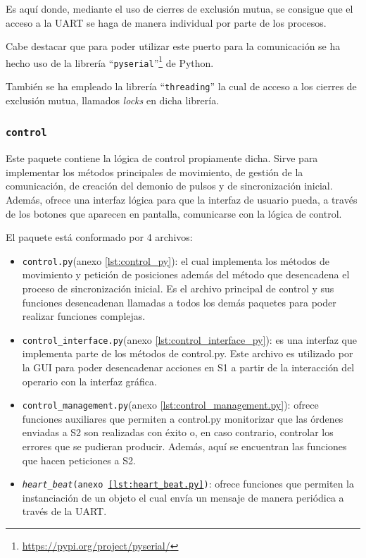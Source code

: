Es aquí donde, mediante el uso de cierres de exclusión mutua, se consigue que el acceso a la UART se haga de manera individual por parte de los procesos.

Cabe destacar que para poder utilizar este puerto para la comunicación se ha hecho uso de la librería ``\texttt{pyserial}''\footnote{\url{https://pypi.org/project/pyserial/}} de Python.

También se ha empleado la librería ``\texttt{threading}'' la cual de acceso a los cierres de exclusión mutua, llamados \textit{locks} en dicha librería.

\subsubsection{\texttt{control}}

Este paquete contiene la lógica de control propiamente dicha. Sirve para implementar los métodos principales de movimiento, de gestión de la comunicación, de creación del demonio de pulsos y de  sincronización inicial. Además, ofrece una interfaz lógica para que la interfaz de usuario pueda, a través de los botones que aparecen en pantalla, comunicarse con la lógica de control.

El paquete está conformado por 4 archivos:

\begin{itemize}
    \item \texttt{control.py}(anexo \ref{lst:control_py}): el cual implementa los métodos de movimiento y petición de posiciones además del método que desencadena el proceso de sincronización inicial. Es el archivo principal de control y sus funciones desencadenan llamadas a todos los demás paquetes para poder realizar funciones complejas.
    \item \texttt{control\_interface.py}(anexo \ref{lst:control_interface_py}): es una interfaz que implementa parte de los métodos de control.py. Este archivo es utilizado por la GUI para poder desencadenar acciones en \ac{S1} a partir de la interacción del operario con la interfaz gráfica.
    \item \texttt{control\_management.py}(anexo \ref{lst:control_management.py}): ofrece funciones auxiliares que permiten a control.py monitorizar que las órdenes enviadas a \ac{S2} son realizadas con éxito o, en caso contrario, controlar los errores que se pudieran producir.
    Además, aquí se encuentran las funciones que hacen peticiones a \ac{S2}.
    \item \texttt{\textit{heart\_beat}(anexo \ref{lst:heart_beat.py})}: ofrece funciones que permiten la instanciación de un objeto el cual envía un mensaje de manera periódica a través de la UART.
\end{itemize}

